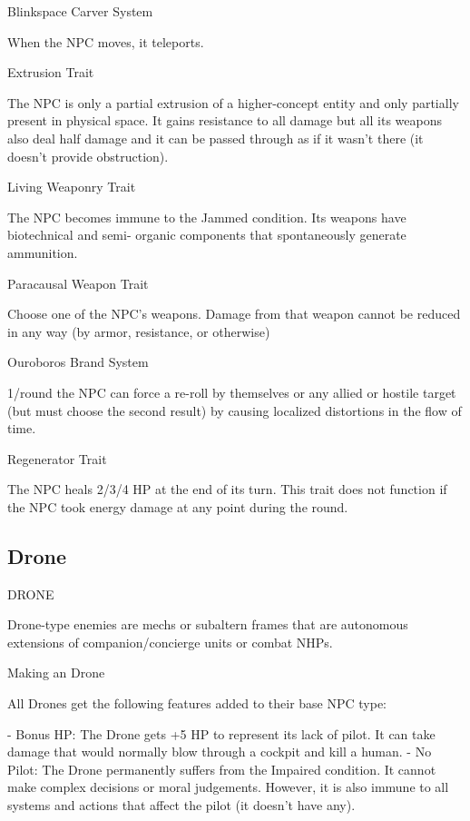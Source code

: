 Blinkspace Carver  
System
 
When the NPC moves, it teleports.
 

Extrusion  
Trait
 
The NPC is only a partial extrusion of a higher-concept entity and only partially present in  
physical space. It gains resistance to all damage but all its weapons also deal half damage and it  
can be passed through as if it wasn’t there (it doesn’t provide obstruction).
 

Living Weaponry  
Trait
 
The NPC becomes immune to the Jammed condition. Its weapons have biotechnical and semi- 
organic components that spontaneously generate ammunition.
 

Paracausal Weapon  
Trait
 
Choose one of the NPC’s weapons. Damage from that weapon cannot be reduced in any way  
(by armor, resistance, or otherwise)
 

Ouroboros Brand  
System
 
1/round the NPC can force a re-roll by themselves or any allied or hostile target (but must choose  
the second result) by causing localized distortions in the flow of time.
 

Regenerator  
Trait
 
The NPC heals 2/3/4 HP at the end of its turn. This trait does not function if the NPC took energy  
damage at any point during the round.
 
\subsection{Drone}
                                                    DRONE   

Drone-type enemies are mechs or subaltern frames that are autonomous extensions of  
companion/concierge units or combat NHPs.  

Making an Drone
 
All Drones get the following features added to their base NPC type:
 
    -    Bonus HP: The Drone gets +5 HP to represent its lack of pilot. It can take damage that  
         would normally blow through a cockpit and kill a human.  
    -    No Pilot: The Drone permanently suffers from the Impaired condition. It cannot make  
         complex decisions or moral judgements. However, it is also immune to all systems and  
         actions that affect the pilot (it doesn’t have any).  

